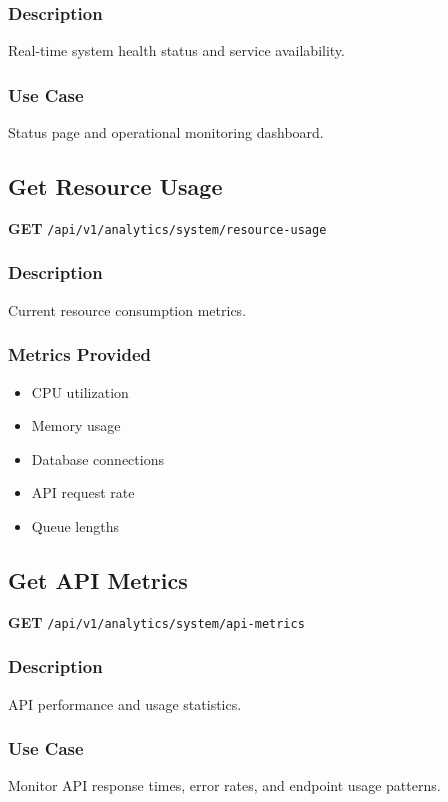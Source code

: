 \documentclass[11pt,a4paper]{report}
\begin{document}
\subsubsection{Description}
Real-time system health status and service availability.

\subsubsection{Use Case}
Status page and operational monitoring dashboard.

\subsection{Get Resource Usage}

\textbf{GET} \texttt{/api/v1/analytics/system/resource-usage}

\subsubsection{Description}
Current resource consumption metrics.

\subsubsection{Metrics Provided}
\begin{itemize}[leftmargin=*]
    \item CPU utilization
    \item Memory usage
    \item Database connections
    \item API request rate
    \item Queue lengths
\end{itemize}

\subsection{Get API Metrics}

\textbf{GET} \texttt{/api/v1/analytics/system/api-metrics}

\subsubsection{Description}
API performance and usage statistics.

\subsubsection{Use Case}
Monitor API response times, error rates, and endpoint usage patterns.
\end{document}
